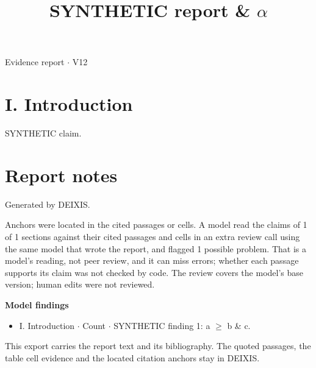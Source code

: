 \documentclass[journal]{IEEEtran}
\begin{document}
\title{SYNTHETIC report \& \ensuremath{\alpha}}

\maketitle

\noindent Evidence report \ensuremath{\cdot} V12

\section*{I. Introduction}

SYNTHETIC claim. \cite{Synth26}

\section*{Report notes}

Generated by DEIXIS.

Anchors were located in the cited passages or cells. A model read the claims of 1 of 1 sections against their cited passages and cells in an extra review call using the same model that wrote the report, and flagged 1 possible problem. That is a model’s reading, not peer review, and it can miss errors; whether each passage supports its claim was not checked by code. The review covers the model's base version; human edits were not reviewed.

\noindent\textbf{Model findings}

\begin{itemize}
\item I. Introduction \ensuremath{\cdot} Count \ensuremath{\cdot} SYNTHETIC finding 1: a \ensuremath{\geq} b \& c.
\end{itemize}

This export carries the report text and its bibliography. The quoted passages, the table cell evidence and the located citation anchors stay in DEIXIS.




\end{document}
